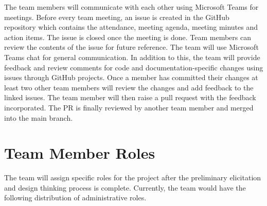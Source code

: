 \documentclass{article}
\begin{document}
The team members will communicate with each other using Microsoft Teams for meetings.  Before every team meeting, an issue is created in the GitHub repository which contains the attendance, meeting agenda, meeting minutes and action items. The issue is closed once the meeting is done. Team members can review the contents of the issue for future reference. The team will use Microsoft Teams chat for general communication. 
In addition to this, the team will provide feedback and review comments for code and documentation-specific changes using issues through GitHub projects. Once a member has committed their changes at least two other team members will review the changes and add feedback to the linked issues. The team member will then raise a pull request with the feedback incorporated. The PR is finally reviewed by another team member and merged into the main branch. 

\section{Team Member Roles}
 
The team will assign specific roles for the project after the preliminary elicitation and design thinking process is complete. Currently, the team would have the following distribution of administrative roles.
\end{document}
